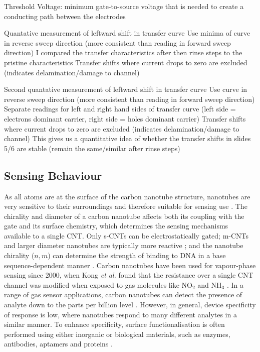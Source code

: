 \documentclass[
  a4paper,
]{scrbook}
\begin{document}
Threshold Voltage: minimum gate-to-source voltage that is needed to
create a conducting path between the electrodes

Quantative measurement of leftward shift in transfer curve Use minima of
curve in reverse sweep direction (more consistent than reading in
forward sweep direction) I compared the transfer characteristics after
then rinse steps to the pristine characteristics Transfer shifts where
current drops to zero are excluded (indicates delamination/damage to
channel)

Second quantative measurement of leftward shift in transfer curve Use
curve in reverse sweep direction (more consistent than reading in
forward sweep direction) Separate readings for left and right hand sides
of transfer curve (left side = electrons dominant carrier, right side =
holes dominant carrier) Transfer shifts where current drops to zero are
excluded (indicates delamination/damage to channel) This gives us a
quantitative idea of whether the transfer shifts in slides 5/6 are
stable (remain the same/similar after rinse steps)

\hypertarget{sec-CNT-sensing-mechanisms}{%
\subsection{Sensing Behaviour}\label{sec-CNT-sensing-mechanisms}}

As all atoms are at the surface of the carbon nanotube structure,
nanotubes are very sensitive to their surroundings and therefore
suitable for sensing use \autocite{Cao2009,Yao2021,Shkodra2021}. The
chirality and diameter of a carbon nanotube affects both its coupling
with the gate and its surface chemistry, which determines the sensing
mechanisms available to a single CNT. Only s-CNTs can be
electrostatically gated; m-CNTs and larger diameter nanotubes are
typically more reactive \autocite{Cao2009,Li2023}; and the nanotube
chirality (\(n,m\)) can determine the strength of binding to DNA in a
base sequence-dependent manner \autocite{Rouhi2011a}. Carbon nanotubes
have been used for vapour-phase sensing since 2000, when Kong \emph{et
al.} found that the resistance over a single CNT channel was modified
when exposed to gas molecules like NO\(_2\) and NH\(_3\)
\autocite{Kong2000}. In a range of gas sensor applications, carbon
nanotubes can detect the presence of analyte down to the parts per
billion level \autocite{Chen2019,Yao2021}. However, in general, device
specificity of response is low, where nanotubes respond to many
different analytes in a similar manner. To enhance specificity, surface
functionalisation is often performed using either inorganic or
biological materials, such as enzymes, antibodies, aptamers and proteins
\autocite{Cao2009,Shkodra2021,Yao2021}.
\end{document}
